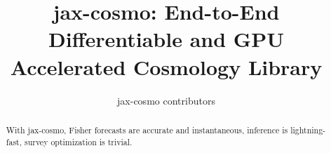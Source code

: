 \documentclass[final,5p,times,twocolumn,authoryear]{elsarticle}
\begin{document}
\begin{frontmatter}



\title{jax-cosmo: End-to-End Differentiable and GPU Accelerated Cosmology Library}


\author{jax-cosmo contributors}

\address{}

\begin{abstract}
With jax-cosmo, Fisher forecasts are accurate and instantaneous, inference is lightning-fast, survey optimization is trivial.
\end{abstract}



\begin{keyword}



\end{keyword}

\end{frontmatter}
\end{document}
